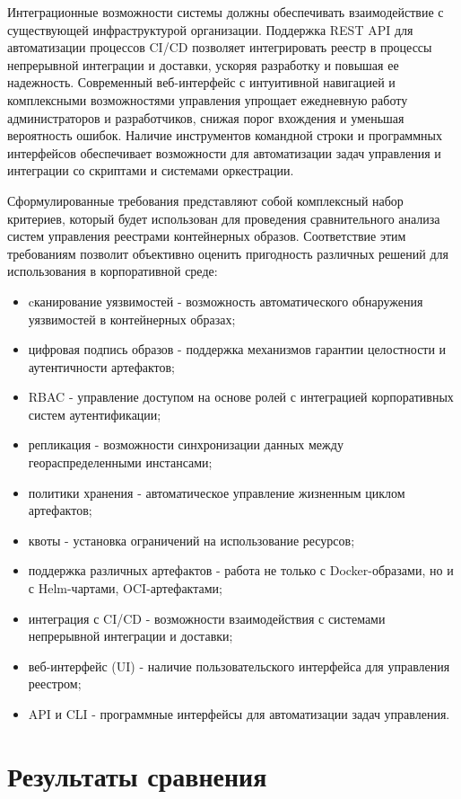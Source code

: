 Интеграционные возможности системы должны обеспечивать взаимодействие с существующей инфраструктурой организации. Поддержка REST API для автоматизации процессов CI/CD позволяет интегрировать реестр в процессы непрерывной интеграции и доставки, ускоряя разработку и повышая ее надежность. Современный веб-интерфейс с интуитивной навигацией и комплексными возможностями управления упрощает ежедневную работу администраторов и разработчиков, снижая порог вхождения и уменьшая вероятность ошибок. Наличие инструментов командной строки и программных интерфейсов обеспечивает возможности для автоматизации задач управления и интеграции со скриптами и системами оркестрации.

Сформулированные требования представляют собой комплексный набор критериев, который будет использован для проведения сравнительного анализа систем управления реестрами контейнерных образов. Соответствие этим требованиям позволит объективно оценить пригодность различных решений для использования в корпоративной среде:

\begin{itemize}
	\item cканирование уязвимостей - возможность автоматического обнаружения уязвимостей в контейнерных образах;
	\item цифровая подпись образов - поддержка механизмов гарантии целостности и аутентичности артефактов;
	\item RBAC - управление доступом на основе ролей с интеграцией корпоративных систем аутентификации;
	\item репликация - возможности синхронизации данных между геораспределенными инстансами;
	\item политики хранения - автоматическое управление жизненным циклом артефактов;
	\item квоты - установка ограничений на использование ресурсов;
	\item поддержка различных артефактов - работа не только с Docker-образами, но и с Helm-чартами, OCI-артефактами;
	\item интеграция с CI/CD - возможности взаимодействия с системами непрерывной интеграции и доставки;
	\item веб-интерфейс (UI) - наличие пользовательского интерфейса для управления реестром;
	\item API и CLI - программные интерфейсы для автоматизации задач управления.
\end{itemize}

\section{Результаты сравнения}

